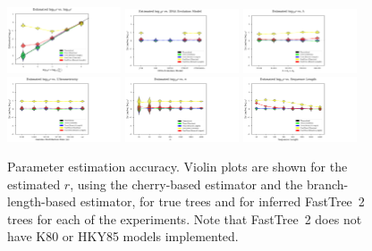 \begin{figure} %
\centering
\includegraphics[width=0.3\textwidth]{figs/dualbirth-res-cherry-supp-a}
\includegraphics[width=0.3\textwidth]{figs/dualbirth-res-cherry-supp-b}
\includegraphics[width=0.3\textwidth]{figs/dualbirth-res-cherry-supp-c}\\
\includegraphics[width=0.3\textwidth]{figs/dualbirth-res-cherry-supp-d}
\includegraphics[width=0.3\textwidth]{figs/dualbirth-res-cherry-supp-e}
\includegraphics[width=0.3\textwidth]{figs/dualbirth-res-cherry-supp-f}
\caption[Parameter Estimation Accuracy]
{Parameter estimation accuracy. Violin plots are shown for the estimated $r$, using the cherry-based estimator and the branch-length-based estimator, for true trees and for inferred FastTree~2 trees for each of the experiments. Note that FastTree~2 does not have \gls{K80} or \gls{HKY85} models implemented.}
\label{fig:dualbirth-res-cherry-supp}
\end{figure}

